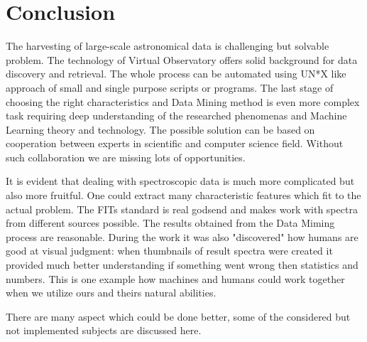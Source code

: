 \chapter{Conclusion}

The harvesting of large-scale astronomical data is challenging but
solvable problem. The technology of Virtual Observatory offers solid
background for data discovery and retrieval. The whole process can be
automated using UN*X like approach of small and single purpose scripts
or programs. The last stage of choosing the right characteristics and
Data Mining method is even more complex task requiring deep
understanding of the researched phenomenas and Machine Learning theory
and technology. The possible solution can be based on cooperation
between experts in scientific and computer science field. Without such
collaboration we are missing lots of opportunities.

It is evident that dealing with spectroscopic data is much more
complicated but also more fruitful. One could extract many
characteristic features which fit to the actual problem. The FITs
standard is real godsend and makes work with spectra from different
sources possible. The results obtained from the Data Miming process
are reasonable. During the work it was also "discovered" how humans
are good at visual judgment: when thumbnails of result spectra were
created it provided much better understanding if something went wrong
then statistics and numbers. This is one example how machines and
humans could work together when we utilize ours and theirs natural
abilities.

There are many aspect which could be done better, some of the
considered but not implemented subjects are discussed here.

